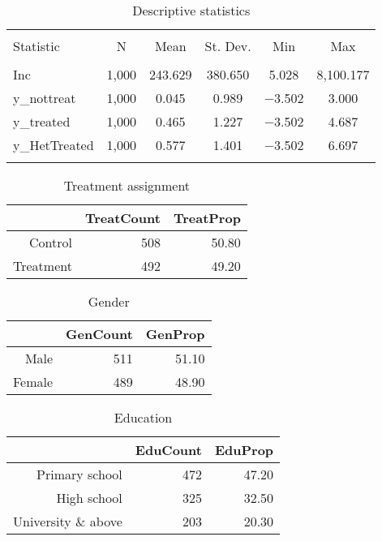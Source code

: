 \documentclass[11pt, a4paper]{article}\usepackage[]{graphicx}\usepackage[]{color}
\begin{document}
\begin{table}[!htbp] \centering 
  \caption{Descriptive statistics} 
  \label{} 
\begin{tabular}{@{\extracolsep{5pt}}lccccc} 
\\[-1.8ex]\hline 
\hline \\[-1.8ex] 
Statistic & \multicolumn{1}{c}{N} & \multicolumn{1}{c}{Mean} & \multicolumn{1}{c}{St. Dev.} & \multicolumn{1}{c}{Min} & \multicolumn{1}{c}{Max} \\ 
\hline \\[-1.8ex] 
Inc & 1,000 & 243.629 & 380.650 & 5.028 & 8,100.177 \\ 
y\_nottreat & 1,000 & 0.045 & 0.989 & $-$3.502 & 3.000 \\ 
y\_treated & 1,000 & 0.465 & 1.227 & $-$3.502 & 4.687 \\ 
y\_HetTreated & 1,000 & 0.577 & 1.401 & $-$3.502 & 6.697 \\ 
\hline \\[-1.8ex] 
\end{tabular} 
\end{table} 
\begin{table}[ht]
\centering
\caption{Treatment assignment} 
\begin{tabular}{rrr}
  \hline
 & TreatCount & TreatProp \\ 
  \hline
Control & 508 & 50.80 \\ 
  Treatment & 492 & 49.20 \\ 
   \hline
\end{tabular}
\end{table}
\begin{table}[ht]
\centering
\caption{Gender} 
\begin{tabular}{rrr}
  \hline
 & GenCount & GenProp \\ 
  \hline
Male & 511 & 51.10 \\ 
  Female & 489 & 48.90 \\ 
   \hline
\end{tabular}
\end{table}
\begin{table}[ht]
\centering
\caption{Education} 
\begin{tabular}{rrr}
  \hline
 & EduCount & EduProp \\ 
  \hline
Primary school & 472 & 47.20 \\ 
  High school & 325 & 32.50 \\ 
  University \& above & 203 & 20.30 \\ 
   \hline
\end{tabular}
\end{table}
\end{document}
